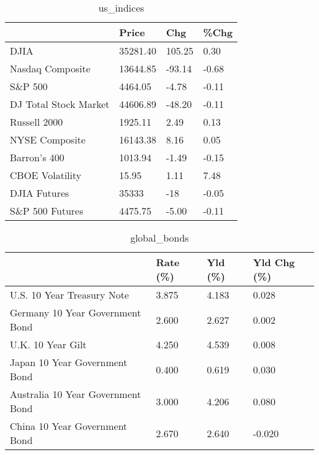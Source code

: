 \documentclass{article}%
\begin{document}
%


\begin{table}[htbp]%
\caption{us\_indices}%
\centering%
\begin{adjustbox}{width=1\textwidth}%
\begin{tabular}{llll}
\toprule
                      &    Price &    Chg &  \%Chg \\
\midrule
                 DJIA & 35281.40 & 105.25 &  0.30 \\
     Nasdaq Composite & 13644.85 & -93.14 & -0.68 \\
              S\&P 500 &  4464.05 &  -4.78 & -0.11 \\
DJ Total Stock Market & 44606.89 & -48.20 & -0.11 \\
         Russell 2000 &  1925.11 &   2.49 &  0.13 \\
       NYSE Composite & 16143.38 &   8.16 &  0.05 \\
         Barron's 400 &  1013.94 &  -1.49 & -0.15 \\
      CBOE Volatility &    15.95 &   1.11 &  7.48 \\
         DJIA Futures &    35333 &    -18 & -0.05 \\
      S\&P 500 Futures &  4475.75 &  -5.00 & -0.11 \\
\bottomrule
\end{tabular}
%
\end{adjustbox}%
\end{table}

%


\begin{table}[htbp]%
\caption{global\_bonds}%
\centering%
\begin{adjustbox}{width=1\textwidth}%
\begin{tabular}{llll}
\toprule
                                  & Rate (\%) & Yld (\%) & Yld Chg (\%) \\
\midrule
       U.S. 10 Year Treasury Note &    3.875 &   4.183 &       0.028 \\
  Germany 10 Year Government Bond &    2.600 &   2.627 &       0.002 \\
                U.K. 10 Year Gilt &    4.250 &   4.539 &       0.008 \\
    Japan 10 Year Government Bond &    0.400 &   0.619 &       0.030 \\
Australia 10 Year Government Bond &    3.000 &   4.206 &       0.080 \\
    China 10 Year Government Bond &    2.670 &   2.640 &      -0.020 \\
\bottomrule
\end{tabular}
%
\end{adjustbox}%
\end{table}
\end{document}
